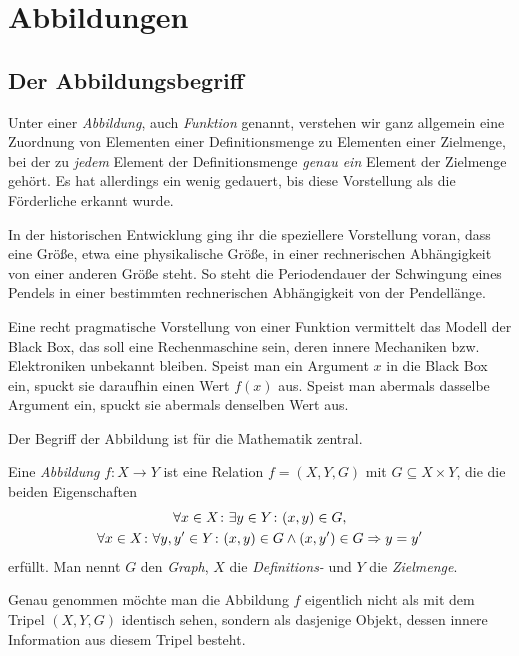 \newpage
\section{Abbildungen}

\subsection{Der Abbildungsbegriff}

Unter einer \emph{Abbildung}, auch \emph{Funktion}%
 genannt, verstehen wir ganz allgemein eine Zuordnung von
Elementen einer Definitionsmenge zu Elementen einer Zielmenge, bei der
zu \emph{jedem} Element der Definitionsmenge \emph{genau ein} Element
der Zielmenge gehört. Es hat allerdings ein wenig gedauert, bis
diese Vorstellung als die Förderliche erkannt wurde.

In der historischen Entwicklung ging ihr die speziellere Vorstellung
voran, dass eine Größe, etwa eine physikalische Größe, in einer
rechnerischen Abhängigkeit von einer anderen Größe steht. So steht
die Periodendauer der Schwingung eines Pendels in einer bestimmten
rechnerischen Abhängigkeit von der Pendellänge.

Eine recht pragmatische Vorstellung von einer Funktion vermittelt das Modell
der Black Box, das soll eine Rechenmaschine sein, deren innere Mechaniken
bzw. Elektroniken unbekannt bleiben. Speist man ein Argument $x$ in die
Black Box ein, spuckt sie daraufhin einen Wert $f(x)$ aus. Speist man
abermals dasselbe Argument ein, spuckt sie abermals denselben Wert aus.

Der Begriff der Abbildung ist für die Mathematik zentral.

\begin{Definition}[Abbildung]\newlinefirst
Eine \emph{Abbildung} $f\colon X\to Y$ ist eine Relation $f=(X,Y,G)$ mit
$G\subseteq X\times Y$, die die beiden Eigenschaften
\begin{gather*}
\forall x\in X\colon\exists y\in Y\colon (x,y)\in G,\\
\forall x\in X\colon\forall y,y'\in Y\colon (x,y)\in G\land (x,y')\in G\Rightarrow y=y'
\end{gather*}
erfüllt. Man nennt $G$ den \emph{Graph}, $X$ die \emph{Definitions-} und
$Y$ die \emph{Zielmenge}.
\end{Definition}
Genau genommen möchte man die Abbildung $f$ eigentlich nicht als mit
dem Tripel $(X,Y,G)$ identisch sehen, sondern als dasjenige Objekt,
dessen innere Information aus diesem Tripel besteht.


